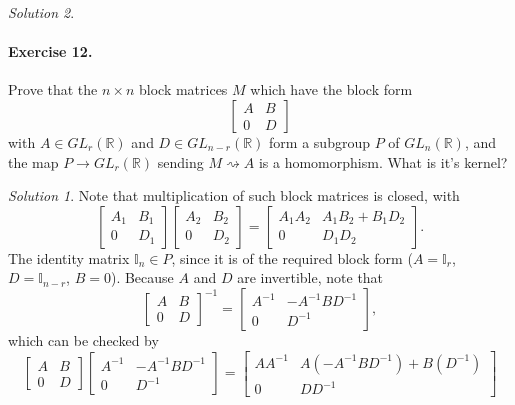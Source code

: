 \documentclass[11pt]{report}
\def\R{\mathbb{R}}
\theoremstyle{remark}
\newtheorem*{solution}{Solution}
\begin{document}
\begin{solution}
    \paragraph{Exercise 12.} Prove that the $n\times n$ block matrices $M$ which
    have the block form \[
        \begin{bmatrix}
            A & B \\ 0 & D
        \end{bmatrix}
    \] with $A \in GL_r(\R)$ and $D \in GL_{n - r}(\R)$ form a subgroup $P$ of
    $GL_n(\R)$, and the map $P \to GL_r(\R)$ sending $M \rightsquigarrow A$ is a
    homomorphism. What is it's kernel?
    \begin{solution}
        Note that multiplication of such block matrices is closed, with \[
            \begin{bmatrix}
                A_1 & B_1 \\ 0 & D_1
            \end{bmatrix} \begin{bmatrix}
                A_2 & B_2 \\ 0 & D_2
            \end{bmatrix} = \begin{bmatrix}
                A_1A_2 & A_1B_2 + B_1D_2 \\ 0 & D_1D_2
            \end{bmatrix}.
        \] The identity matrix $\mathbb{I}_n \in P$, since it is of the required
        block form ($A = \mathbb{I}_r$, $D = \mathbb{I}_{n - r}$, $B = 0$). Because
        $A$ and $D$ are invertible, note that \[
            \begin{bmatrix}
                A & B \\ 0 & D
            \end{bmatrix}^{-1} = \begin{bmatrix}
                A^{-1} & -A^{-1}BD^{-1} \\ 0 & D^{-1}
            \end{bmatrix},
        \] which can be checked by \[
            \begin{bmatrix}
                A & B \\ 0 & D
            \end{bmatrix} \begin{bmatrix}
                A^{-1} & -A^{-1}BD^{-1} \\ 0 & D^{-1}
            \end{bmatrix} = \begin{bmatrix}
                A A^{-1} & A(-A^{-1}BD^{-1}) + B(D^{-1}) \\ 0 & D D^{-1}

\end{bmatrix}\]
\end{solution}
\end{solution}
\end{document}
